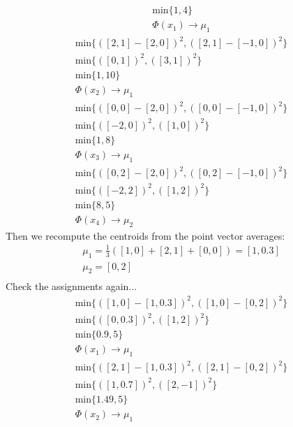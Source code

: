 \documentclass[12pt]{article}
\begin{document}
\begin{enumerate}[label=(\alph*)]
\begin{gather*}
				\text{min} \{ 1, 4\} \\
				\Phi(x_1) \rightarrow \mu_1
			\end{gather*}
			\begin{gather*}
				\text{min} \{ ( [2,1] - [2, 0] )^2, ( [2,1] - [-1, 0] )^2\} \\
				\text{min} \{ ( [0,1] )^2, ( [3, 1] )^2\} \\
				\text{min} \{ 1, 10\} \\
				\Phi(x_2) \rightarrow \mu_1
			\end{gather*}
			\begin{gather*}
				\text{min} \{ ( [0,0] - [2, 0] )^2, ( [0,0] - [-1, 0] )^2\} \\
				\text{min} \{ ( [-2,0] )^2, ( [1, 0] )^2\} \\
				\text{min} \{ 1, 8\} \\
				\Phi(x_3) \rightarrow \mu_1
			\end{gather*}
			\begin{gather*}
				\text{min} \{ ( [0,2] - [2, 0] )^2, ( [0,2] - [-1, 0] )^2\} \\
				\text{min} \{ ( [-2,2] )^2, ( [1, 2] )^2\} \\
				\text{min} \{ 8, 5\} \\
				\Phi(x_4) \rightarrow \mu_2
			\end{gather*}
			Then we recompute the centroids from the point vector averages:
			\begin{gather*}
				\mu_1 = \frac{1}{3} ( [1,0] + [2, 1] + [0, 0] ) =  [1, 0.3] \\
				\mu_2 = [0, 2] \\
			\end{gather*}
			Check the assignments again...
			\begin{gather*}
				\text{min} \{ ( [1,0] - [1, 0.3] )^2, ( [1,0] - [0, 2] )^2\} \\
				\text{min} \{ ( [0,0.3] )^2, ( [1, 2] )^2\} \\
				\text{min} \{ 0.9, 5\} \\
				\Phi(x_1) \rightarrow \mu_1
			\end{gather*}
			\begin{gather*}
				\text{min} \{ ( [2,1] - [1, 0.3] )^2, ( [2,1] - [0, 2] )^2\} \\
				\text{min} \{ ( [1,0.7] )^2, ( [2, -1] )^2\} \\
				\text{min} \{ 1.49, 5\} \\
				\Phi(x_2) \rightarrow \mu_1
			\end{gather*}

\end{enumerate}
\end{document}

